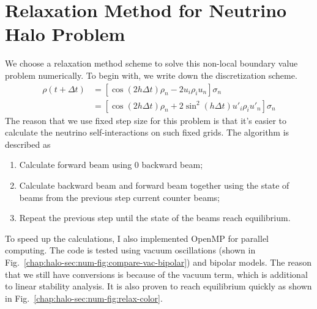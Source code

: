 \section{\label{chap:halo-sec:num}Relaxation Method for Neutrino Halo Problem}


We choose a relaxation method scheme to solve this non-local boundary value problem numerically. To begin with, we write down the discretization scheme.
\begin{align}
    \rho(t+\Delta t) &= \left[  \cos( 2 h \Delta t)\rho_n -  2 u_i \rho_i u_n \right]\sigma_n \\
    &= \left[  \cos( 2 h \Delta t) \rho_n +  2 \sin^2(h \Delta t) u'_i \rho_i u'_n \right]\sigma_n
\end{align}
The reason that we use fixed step size for this problem is that it's easier to calculate the neutrino self-interactions on such fixed grids. The algorithm is described as
\begin{enumerate}
    \item
Calculate forward beam using 0 backward beam;
\item
Calculate backward beam and forward beam together using the state of beams from the previous step current counter beams;
\item
Repeat the previous step until the state of the beams reach equilibrium.
\end{enumerate}
To speed up the calculations, I also implemented OpenMP for parallel computing. The code is tested using vacuum oscillations (shown in Fig.~\ref{chap:halo-sec:num-fig:compare-vac-bipolar}) and bipolar models. The reason that we still have conversions is because of the vacuum term, which is additional to linear stability analysis. It is also proven to reach equilibrium quickly as shown in Fig.~\ref{chap:halo-sec:num-fig:relax-color}.

